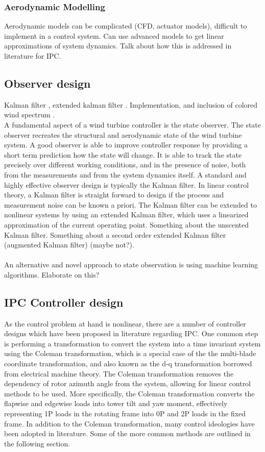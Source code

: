 \subsubsection{Aerodynamic Modelling}
Aerodynamic models can be complicated (CFD, actuator models), difficult to implement in a control system. Can use advanced models to get linear approximations of system dynamics. Talk about how this is addressed in literature for IPC.
\cite{11_Wang}

\subsection{Observer design}
Kalman filter \cite{15_bossanyi}, extended kalman filter \cite{2_Kanev}. Implementation, and inclusion of colored wind spectrum \cite{14_Selvam}. 
\\
A fundamental aspect of a wind turbine controller is the state observer. The state observer recreates the structural and aerodynamic state of the wind turbine system. A good observer is able to improve controller response by providing a short term prediction how the state will change. It is able to track the state precisely over different working conditions, and in the presence of noise, both from the measurements and from the system dynamics itself. A standard and highly effective observer design is typically the Kalman filter. In linear control theory, a Kalman filter is straight forward to design if the process and measurement noise can be known a priori. The Kalman filter can be extended to nonlinear systems by using an extended Kalman filter, which uses a linearized approximation of the current operating point. Something about the unscented Kalman filter. Something about a second order extended Kalman filter (augmented Kalman filter) (maybe not?).
\\~\\
An alternative and novel approach to state observation is using machine learning algorithms. Elaborate on this?
\subsection{IPC Controller design}
As the control problem at hand is nonlinear, there are a number of controller designs which have been proposed in literature regarding IPC. One common step is performing a transformation to convert the system into a time invariant system using the Coleman transformation, which is a special case of the the multi-blade coordinate transformation, and also known as the d-q transformation borrowed from electrical machine theory. The Coleman transformation removes the dependency of rotor azimuth angle from the system, allowing for linear control methods to be used. More specifically, the Coleman transformation converts the flapwise and edgewise loads into tower tilt and yaw moment, effectively representing 1P loads in the rotating frame into 0P and 2P loads in the fixed frame. In addition to the Coleman transformation, many control ideologies have been adopted in literature. Some of the more common methods are outlined in the following section.


